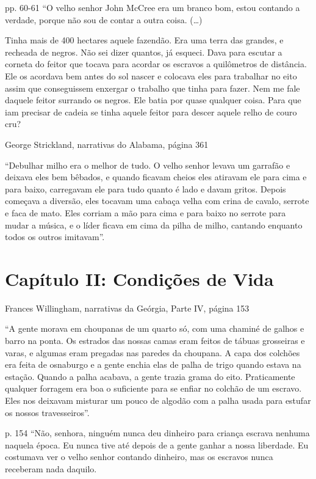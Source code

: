 pp. 60-61 ``O velho senhor John McCree era um branco bom, estou contando
a verdade, porque não sou de contar a outra coisa. (\ldots{})

Tinha mais de 400 hectares aquele fazendão. Era uma terra das grandes, e
recheada de negros. Não sei dizer quantos, já esqueci. Dava para escutar
a corneta do feitor que tocava para acordar os escravos a quilômetros de
distância. Ele os acordava bem antes do sol nascer e colocava eles para
trabalhar no eito assim que conseguissem enxergar o trabalho que tinha
para fazer. Nem me fale daquele feitor surrando os negros. Ele batia por
quase qualquer coisa. Para que iam precisar de cadeia se tinha aquele
feitor para descer aquele relho de couro cru?

George Strickland, narrativas do Alabama, página 361

``Debulhar milho era o melhor de tudo. O velho senhor levava um garrafão
e deixava eles bem bêbados, e quando ficavam cheios eles atiravam ele
para cima e para baixo, carregavam ele para tudo quanto é lado e davam
gritos. Depois começava a diversão, eles tocavam uma cabaça velha com
crina de cavalo, serrote e faca de mato. Eles corriam a mão para cima e
para baixo no serrote para mudar a música, e o líder ficava em cima da
pilha de milho, cantando enquanto todos os outros imitavam''.

\chapter{Capítulo II: Condições de Vida}

Frances Willingham, narrativas da Geórgia, Parte IV, página 153

``A gente morava em choupanas de um quarto só, com uma chaminé de galhos
e barro na ponta. Os estrados das nossas camas eram feitos de tábuas
grosseiras e varas, e algumas eram pregadas nas paredes da choupana. A
capa dos colchões era feita de osnaburgo e a gente enchia elas de palha
de trigo quando estava na estação. Quando a palha acabava, a gente
trazia grama do eito. Praticamente qualquer forragem era boa o
suficiente para se enfiar no colchão de um escravo. Eles nos deixavam
misturar um pouco de algodão com a palha usada para estufar os nossos
travesseiros''.

p. 154 ``Não, senhora, ninguém nunca deu dinheiro para criança escrava
nenhuma naquela época. Eu nunca tive até depois de a gente ganhar a
nossa liberdade. Eu costumava ver o velho senhor contando dinheiro, mas
os escravos nunca receberam nada daquilo.

